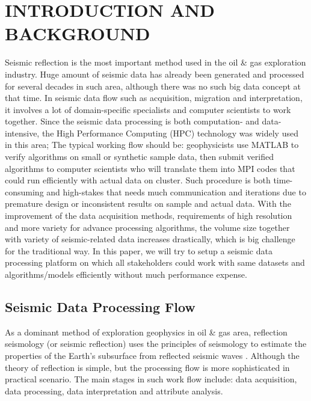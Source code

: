 %
%
%



\pagestyle{plain} %
\setcounter{page}{1}


\chapter{\uppercase {Introduction and Background}}

Seismic reflection is the most important method used in the oil \& gas exploration industry. Huge amount of seismic data has already been generated and processed for several decades in such area, although there was no such big data concept at that time. In seismic data flow such as acquisition, migration and interpretation, it involves a lot of domain-specific specialists and computer scientists to work together. Since the seismic data processing is both computation- and data-intensive, the High Performance Computing (HPC) technology was widely used in this area; The typical working flow should be: geophysicists use MATLAB to verify algorithms on small or synthetic sample data, then submit verified algorithms to computer scientists who will translate them into MPI codes that could run efficiently with actual data on cluster. Such procedure is both time-consuming and high-stakes that needs much communication and iterations due to premature design or inconsistent results on sample and actual data. With the improvement of the data acquisition methods, requirements of high resolution and more variety for advance processing algorithms, the volume size together with variety of seismic-related data increases drastically, which is big challenge for the traditional way. In this paper, we will try to setup a seismic data processing platform on which all stakeholders could work with same datasets and algorithms/models efficiently without much performance expense.

\section{Seismic Data Processing Flow}
As a dominant method of exploration geophysics in oil \& gas area, reflection seismology (or seismic reflection) uses the principles of seismology to estimate the properties of the Earth's subsurface from reflected seismic waves \cite{seisreflectionwiki}. Although the theory of reflection is simple, but the processing flow is more sophisticated in practical scenario. The main stages in such work flow include: data acquisition, data processing, data interpretation and attribute analysis.

